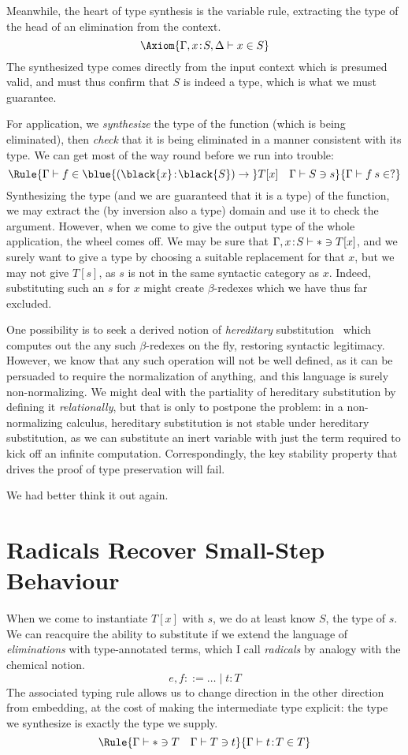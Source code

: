 \documentclass[natbib]{article}
\newcommand{\type}{\ast}
\newcommand{\hb}{\!:\!}
\newcommand{\PI}[2]{\blue{(\black{#1}\hb \black{#2})\to\;}}
\begin{document}
Meanwhile, the heart of type synthesis is the variable rule, extracting the type of the head of an elimination from the context.
\[
\Axiom{\SYN{\Gamma,x\hb S,\Delta}{x}{S}}
\]
The synthesized type comes directly from the input context which is presumed valid, and must thus confirm that $S$ is indeed a type, which is what we must guarantee.

For application, we \emph{synthesize} the type of the function (which is being eliminated), then \emph{check} that it is being eliminated in a manner consistent with its type.
We can get most of the way round before we run into trouble:
\[
\Rule{\SYN\Gamma f {\PI xS T[x]} \quad \CHK\Gamma Ss}
     {\SYN\Gamma{f\:s}{?}}
\]
Synthesizing the type (and we are guaranteed that it is a type) of the function, we may extract the (by inversion also a type) domain and use it to check the argument. However, when we come to give the output type of the whole application, the wheel comes off. We may be sure that $\CHK{\Gamma,x\hb S}\type{T[x]}$, and we surely want to give a type by choosing a suitable replacement for that $x$, but we may not give $T[s]$, as $s$ is not in the same syntactic category as $x$. Indeed, substituting such an $s$ for $x$ might create $\beta$-redexes which we have thus far excluded.

One possibility is to seek a derived notion of \emph{hereditary} substitution~\cite{DBLP:conf/types/WatkinsCPW03} which computes out the any such $\beta$-redexes on the fly, restoring syntactic legitimacy. However, we know that any such operation will not be well defined, as it can be persuaded to require the normalization of anything, and this language is surely non-normalizing. We might deal with the partiality of hereditary substitution by defining it \emph{relationally}, but that is only to postpone the problem: in a non-normalizing calculus, hereditary substitution is not stable under hereditary substitution, as we can substitute an inert variable with just the term required to kick off an infinite computation. Correspondingly, the key stability property that drives the proof of type preservation will fail.

We had better think it out again.


\section{Radicals Recover Small-Step Behaviour}

When we come to instantiate $T[x]$ with $s$, we do at least know $S$, the type of $s$. We can reacquire the ability to substitute if we extend the language of \emph{eliminations} with type-annotated terms, which I call \emph{radicals} by analogy with the chemical notion.
\[
e,f ::= \ldots \;|\; t\hb T
\]
The associated typing rule allows us to change direction in the other direction from embedding, at the cost of making the intermediate type explicit: the type we synthesize is exactly the type we supply.
\[\Rule{\CHK\Gamma\type T\quad \CHK\Gamma Tt}
       {\SYN\Gamma{t\hb T}T}
\]
\end{document}

